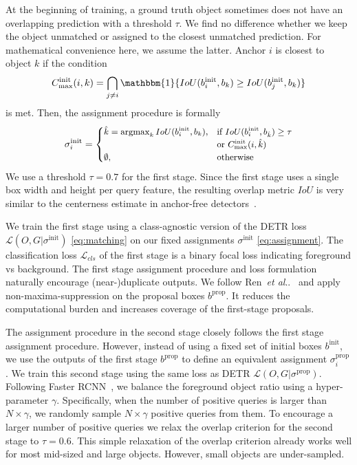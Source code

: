 \documentclass[10pt,twocolumn,letterpaper]{article}
\makeatletter
\newcommand{\myparagraph}[1]{\vspace{2pt}\noindent{\textbf{#1}}}
\DeclareMathOperator*{\argmax}{argmax}
\newcommand{\prop}{{\text{prop}}}
\newcommand{\init}{{\text{init}}}
\newcommand{\refeqshort}[1]{\eqref{eq:#1}}
\newcommand{\lbleq}[1]{\label{eq:#1}}
\DeclareRobustCommand\onedot{\futurelet\@let@token\@onedot}
\def\@onedot{\ifx\@let@token.\else.\null\fi\xspace}
\def\etal{\emph{et al}\onedot}
\makeatother
\begin{document}
At the beginning of training, a ground truth object sometimes does not have an overlapping prediction with a threshold $\tau$.
We find no difference whether we keep the object unmatched or assigned to the closest unmatched prediction.
For mathematical convenience here, we assume the latter.
Anchor $i$ is closest to object $k$ if the condition
\begin{equation}
C^{\init}_{\max}(i,k)=\bigcap_{j\neq i} \mathbbm{1} \{ IoU(b_i^{\init}, b_k) \ge IoU(b_j^{\init}, b_k) \}
\end{equation}
is met. Then, the assignment procedure is formally
\begin{equation}
\small
    \sigma^{\init}_i = 
\begin{cases}
    \hat k = \argmax_k IoU(b_i^{\init}, b_k),
    & \text{if } IoU(b_i^{\init}, b_{\hat k}) \ge \tau\\
    & \text{or } C^{\init}_{\max}(i,\hat k) \\
    \emptyset,                & \text{otherwise}
\end{cases}
\lbleq{assignment}
\normalsize
\end{equation}
We use a threshold $\tau=0.7$ for the first stage.
Since the first stage uses a single box width and height per query feature, the resulting overlap metric $IoU$ is very similar to the centerness estimate in anchor-free detectors~\cite{zhou2021probablistic,tian2019fcos,zhou2019objects}.

We train the first stage using a class-agnostic version of the DETR loss $\mathcal{L}(O, G | \sigma^{\init})$ \refeqshort{matching} on our fixed assignments $\sigma^{\init}$ \refeqshort{assignment}.
The classification loss $\mathcal{L}_{cls}$ of the first stage is a binary focal loss indicating foreground vs background.
The first stage assignment procedure and loss formulation naturally encourage (near-)duplicate outputs.
We follow Ren~\etal~\cite{ren2015faster} and apply non-maxima-suppression on the proposal boxes $b^\prop$.
It reduces the computational burden and increases coverage of the first-stage proposals.

\myparagraph{Second stage assignments.}
The assignment procedure in the second stage closely follows the first stage assignment procedure.
However, instead of using a fixed set of initial boxes $b^\init$, we use the outputs of the first stage $b^\prop$ to define an equivalent assignment $\sigma^\prop_i$.
We train this second stage using the same loss as DETR $\mathcal{L}(O, G|\sigma^\prop)$.
Following Faster RCNN~\cite{ren2015faster}, we balance the foreground object ratio using a hyper-parameter $\gamma$.
Specifically, when the number of positive queries is larger than $N \times \gamma$, we randomly sample $N \times \gamma$ positive queries from them.
To encourage a larger number of positive queries we relax the overlap criterion for the second stage to $\tau=0.6$.
This simple relaxation of the overlap criterion already works well for most mid-sized and large objects.
However, small objects are under-sampled.
\end{document}
